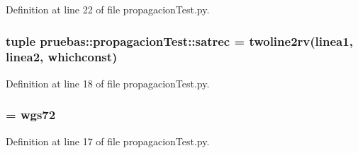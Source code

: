 \-Definition at line 22 of file propagacion\-Test.\-py.

\subsubsection[{satrec}]{\setlength{\rightskip}{0pt plus 5cm}tuple {\bf pruebas\-::propagacion\-Test\-::satrec} = twoline2rv({\bf linea1}, {\bf linea2}, {\bf whichconst})}\label{namespacepruebas_1_1propagacion_test_a44d185a5976262abb54324ded8afc8c3}


\-Definition at line 18 of file propagacion\-Test.\-py.

\subsubsection[{whichconst}]{ = wgs72}\label{namespacepruebas_1_1propagacion_test_a7151554edf1a9078cf537296802a2809}


\-Definition at line 17 of file propagacion\-Test.\-py.

